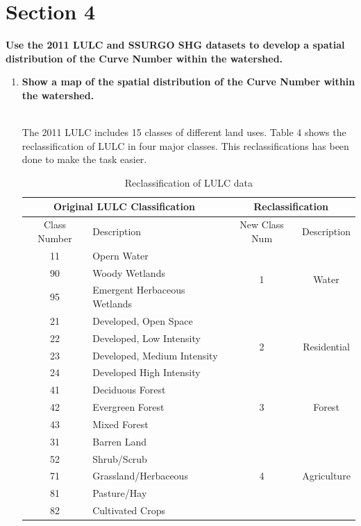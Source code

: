\documentclass[letterpaper,12pt]{article}
\begin{document}
\section*{Section 4}
\textbf{Use the 2011 LULC and SSURGO SHG datasets to develop a spatial distribution of the Curve Number within the watershed.}
\\
\begin{enumerate}
	\item \textbf{Show a map of the spatial distribution of the Curve Number within the watershed.}\\~
	
	The 2011 LULC includes 15 classes of different land uses. Table 4 shows the reclassification of LULC in four major classes. This reclassifications has been done to make the task easier. 

\begin{table}[H]
	\centering
	\caption{Reclassification of LULC data}
	\label{lulcreclass}
	\begin{tabular}{|c|l|c|c|}
		\hline
		\multicolumn{2}{|c|}{\textbf{Original LULC Classification}} & \multicolumn{2}{c|}{\textbf{Reclassification}}                 \\ \hline
		Class Number&Description&New Class Num&Description                  \\ \hline
		11&Opern Water& \multirow{3}{*}{1} & \multirow{3}{*}{Water} \\ \cline{1-2}
		90&Woody Wetlands&&\\ \cline{1-2}
		95&Emergent Herbaceous Wetlands&& \\ \hline
		21&Developed, Open Space& \multirow{4}{*}{2} & \multirow{4}{*}{Residential} \\ \cline{1-2}
		22&Developed, Low Intensity&&\\ \cline{1-2}
		23&Developed, Medium Intensity&&\\ \cline{1-2}
		24&Developed High Intensity&&\\ \hline
		41&Deciduous Forest& \multirow{3}{*}{3} & \multirow{3}{*}{Forest} \\ \cline{1-2}
		42&Evergreen Forest&&\\ \cline{1-2}
		43&Mixed Forest&&\\ \hline
		31&Barren Land& \multirow{5}{*}{4} & \multirow{5}{*}{Agriculture} \\ \cline{1-2}
		52&Shrub/Scrub&&\\ \cline{1-2}
		71&Grassland/Herbaceous&&\\ \cline{1-2}
		81&Pasture/Hay&&\\ \cline{1-2}
		82&Cultivated Crops&&\\ \hline
	\end{tabular}
\end{table}
	

\end{enumerate}
\end{document}
